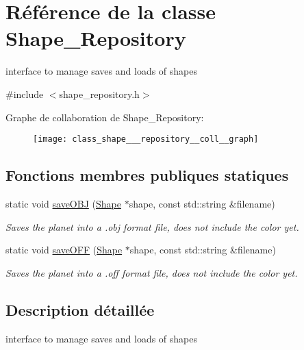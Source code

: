 \hypertarget{class_shape___repository}{}\section{Référence de la classe Shape\+\_\+\+Repository}
\label{class_shape___repository}


interface to manage saves and loads of shapes  




{\ttfamily \#include $<$shape\+\_\+repository.\+h$>$}



Graphe de collaboration de Shape\+\_\+\+Repository\+:
\nopagebreak
\begin{figure}[H]
\begin{center}
\leavevmode
\texttt{[image: class\_shape\_\_\_repository\_\_coll\_\_graph]}
\end{center}
\end{figure}
\subsection*{Fonctions membres publiques statiques}
\begin{DoxyCompactItemize}
\item 
static void \hyperlink{class_shape___repository_a0a0e36f8beab55be3c88e08c823819cd}{save\+O\+BJ} (\hyperlink{class_shape}{Shape} $\ast$shape, const std\+::string \&filename)
\begin{DoxyCompactList}\small\item\em Saves the planet into a .obj format file, does not include the color yet. \end{DoxyCompactList}\item 
static void \hyperlink{class_shape___repository_ad52141b6883d20084a0105355f2271b5}{save\+O\+FF} (\hyperlink{class_shape}{Shape} $\ast$shape, const std\+::string \&filename)
\begin{DoxyCompactList}\small\item\em Saves the planet into a .off format file, does not include the color yet. \end{DoxyCompactList}\end{DoxyCompactItemize}


\subsection{Description détaillée}
interface to manage saves and loads of shapes 

